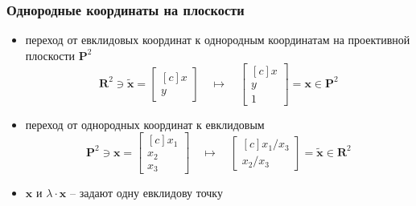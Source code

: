 \documentclass[
    12pt, 
    usepdftitle=false,
    aspectratio=1610
]{beamer}
\begin{document}
\begin{frame}
\frametitle{Однородные координаты на плоскости}
\begin{itemize}
    \item переход от евклидовых координат к однородным координатам на проективной плоскости $\mathbf{P}^2$
    $$
        \mathbf{R}^2\ni\widetilde{\mathbf{x}}=
        \begin{bmatrix*}[c]
            x \\ y   
        \end{bmatrix*}
        \quad\mapsto\quad
        \begin{bmatrix*}[c]
            x \\ y \\ 1
        \end{bmatrix*}
        =\mathbf{x}
        \in\mathbf{P}^2
    $$
    \item переход от однородных координат к  евклидовым
    $$
        \mathbf{P}^2\ni\mathbf{x}=
        \begin{bmatrix*}[c]
            x_1 \\ x_2 \\ x_3
        \end{bmatrix*}
        \quad\mapsto\quad
        \begin{bmatrix*}[c]
            x_1/x_3 \\ x_2/x_3
        \end{bmatrix*}
        =\widetilde{\mathbf{x}}
        \in\mathbf{R}^2
    $$
    \item $\mathbf{x}$ и $\lambda\cdot\mathbf{x}$ -- задают одну евклидову точку
\end{itemize}
\end{frame}
\end{document}
